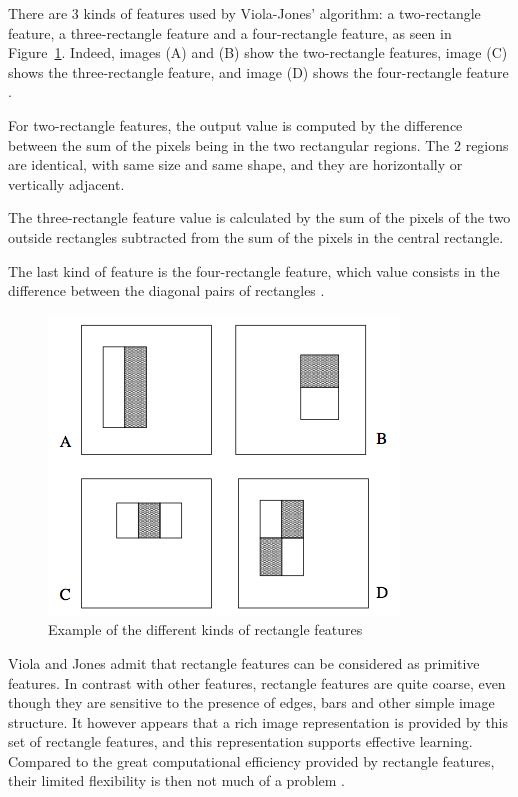 \noindent There are 3 kinds of features used by Viola-Jones' algorithm: a two-rectangle feature, a three-rectangle feature and a four-rectangle feature, as seen in Figure~\ref{haar_feature_description}. Indeed, images (A) and (B) show the two-rectangle features, image (C) shows the three-rectangle feature, and image (D) shows the four-rectangle feature \cite{VIO01}.
\newline

\noindent For two-rectangle features, the output value is computed by the difference between the sum of the pixels being in the two rectangular regions. The 2 regions are identical, with same size and same shape, and they are horizontally or vertically adjacent. 
\newline

\noindent The three-rectangle feature value is calculated by the sum of the pixels of the two outside rectangles subtracted from the sum of the pixels in the central rectangle. 
\newline

\noindent The last kind of feature is the four-rectangle feature, which value consists in the difference between the diagonal pairs of rectangles \cite{VIO01}.
\newline

\begin{figure}[!h]
\begin{center}
\noindent \includegraphics[scale=0.6]{figures/haar_feature_description} 
\newline
\caption{Example of the different kinds of rectangle features}
\label{haar_feature_description}
\end{center} 
\end{figure}

\noindent Viola and Jones admit that rectangle features can be considered as primitive features. In contrast with other features, rectangle features are quite coarse, even though they are sensitive to the presence of edges, bars and other simple image structure. It however appears that a rich image representation is provided by this set of rectangle features, and this representation supports effective learning. Compared to the great computational efficiency provided by rectangle features, their limited flexibility is then not much of a problem \cite{VIO01}.
\newline

